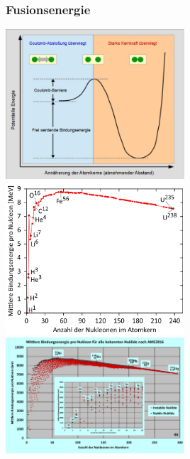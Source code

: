 \documentclass{article}
\begin{document}
    		\subsubsection{Fusionsenergie}
	    		\includegraphics[width=0.5\textwidth]{graphics/potentielleKernenergie.jpg} \\
	    		\includegraphics[width=0.5\textwidth]{graphics/bindungsEnergie.png}
	    		\includegraphics[width=0.5\textwidth]{graphics/bindungsEnergie_big.png} \\
\end{document}
